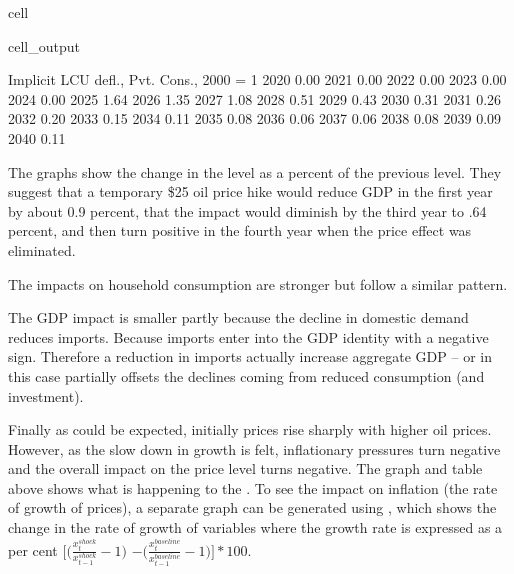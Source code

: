 \documentclass[letterpaper,10pt,english]{jupyterBook}
\begin{document}
\begin{sphinxuseclass}{cell}
\begin{sphinxVerbatimOutput}
\begin{sphinxuseclass}{cell_output}
\begin{sphinxVerbatim}[commandchars=\\\{\}]
      Implicit LCU defl., Pvt. Cons., 2000 = 1  
2020                                      0.00  
2021                                      0.00  
2022                                      0.00  
2023                                      0.00  
2024                                      0.00  
2025                                      1.64  
2026                                      1.35  
2027                                      1.08  
2028                                     \PYGZhy{}0.51  
2029                                     \PYGZhy{}0.43  
2030                                     \PYGZhy{}0.31  
2031                                      0.26  
2032                                      0.20  
2033                                      0.15  
2034                                      0.11  
2035                                      0.08  
2036                                      0.06  
2037                                      0.06  
2038                                      0.08  
2039                                      0.09  
2040                                      0.11  
\end{sphinxVerbatim}

\end{sphinxuseclass}\end{sphinxVerbatimOutput}

\end{sphinxuseclass}
\sphinxAtStartPar
The graphs show the change in the level as a percent of the previous level. They suggest that a temporary \$25 oil price hike would reduce GDP in the first year by about 0.9 percent, that the impact would diminish by the third year to \sphinxhyphen{}.64 percent, and then turn positive in the fourth year when the price effect was eliminated.

\sphinxAtStartPar
The impacts on household consumption are stronger but follow a similar pattern.

\sphinxAtStartPar
The GDP impact is smaller partly because the decline in domestic demand reduces imports.  Because imports enter into the GDP identity with a negative sign. Therefore a reduction in imports actually increase aggregate GDP – or in this case partially offsets the declines coming from reduced consumption (and investment).

\sphinxAtStartPar
Finally as could be expected, initially prices rise sharply with higher oil prices. However, as the slow down in growth is felt, inflationary pressures turn negative and the overall impact on the price level turns negative.  The graph and table above shows what is happening to the . To see the impact on inflation (the rate of growth of prices), a separate graph can be generated using , which shows the change in the rate of growth of variables where the growth rate is expressed as a per cent \(\bigg[\bigg(\frac{x^{shock}_t}{x^{shock}_{t-1}}-1\bigg)\) \( - \bigg(\frac{x^{baseline}_t}{x^{baseline}_{t-1}}-1\bigg)\Bigg]*100\).
\end{document}
